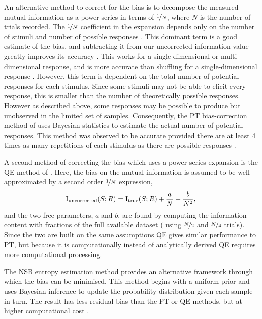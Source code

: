 An alternative method to correct for the bias is to decompose the measured mutual information as a power series in terms of $\nicefrac{1}{N}$, where $N$ is the number of trials recorded.
The $\nicefrac{1}{N}$ coefficient in the expansion depends only on the number of stimuli and number of possible responses \citep{Miller1955,Treves1995}.
This dominant term is a good estimate of the bias, and subtracting it from our uncorrected information value greatly improves its accuracy \citep{Treves1995}.
This works for a single-dimensional or multi-dimensional response, and is more accurate than shuffling for a single-dimensional response \citep{Panzeri1996}.
However, this term is dependent on the total number of potential responses for each stimulus.
Since some stimuli may not be able to elicit every response, this is smaller than the number of theoretically possible responses.
However as described above, some responses may be possible to produce but unobserved in the limited set of samples.
Consequently, the \ac{PT} bias-correction method of \citet{Panzeri1996} uses Bayesian statistics to estimate the actual number of potential responses.
This method was observed to be accurate provided there are at least \num{4} times as many repetitions of each stimulus as there are possible responses \citep{Panzeri2007}.

A second method of correcting the bias which uses a power series expansion is the \ac{QE} method of \citet{Strong1998}.
Here, the bias on the mutual information is assumed to be well approximated by a second order $\nicefrac{1}{N}$ expression,
\begin{equation}
\operatorname{I}_{\text{uncorrected}}(S;R) =
\operatorname{I}_{\text{true}}(S;R) + \frac{a}{N} + \frac{b}{N^2}
,\end{equation}
and the two free parameters, $a$ and $b$, are found by computing the information content with fractions of the full available dataset (\ie{} using $\nicefrac{N}{2}$ and $\nicefrac{N}{4}$ trials).
Since the two are built on the same assumptions \ac{QE} gives similar performance to \ac{PT}, but because it is computationally instead of analytically derived \ac{QE} requires more computational processing.


The \ac{NSB} entropy estimation method \citep{Nemenman2004} provides an alternative framework through which the bias can be minimised.
This method begins with a uniform prior and uses Bayesian inference to update the probability distribution given each sample in turn.
The result has less residual bias than the \ac{PT} or \ac{QE} methods, but at higher computational cost \citep{Panzeri2007}.

